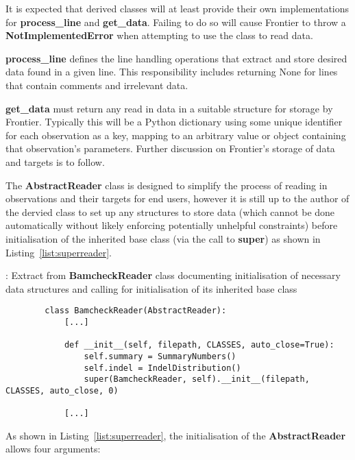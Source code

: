 It is expected that derived classes will at least provide their own
implementations for \textbf{process\_line} and \textbf{get\_data}. Failing to do
so will cause Frontier to throw a \textbf{NotImplementedError} when attempting
to use the class to read data.

\textbf{process\_line} defines the line handling operations that extract and store
desired data found in a given line. This responsibility includes returning None
for lines that contain comments and irrelevant data.

\textbf{get\_data} must return any read in data in a suitable structure for
storage by Frontier. Typically this will be a Python dictionary using some
unique identifier for each observation as a key, mapping to an arbitrary value
or object containing that observation's parameters. Further discussion on
Frontier's storage of data and targets is to follow.

The \textbf{AbstractReader} class is designed to simplify the process of reading
in observations and their targets for end users, however it is still up to the
author of the dervied class to set up any structures to store data (which cannot
be done automatically without likely enforcing potentially unhelpful
constraints) before initialisation of the inherited base class (via the call to
\textbf{super}) as shown in Listing~\ref{list:superreader}.

\begin{listing}[H]
    \caption[superreader]{: Extract from \textbf{BamcheckReader} class
        documenting initialisation of necessary data structures and calling
        for initialisation of its inherited base class}
    \label{list:superreader}
    \begin{verbatim}
        class BamcheckReader(AbstractReader):
            [...]

            def __init__(self, filepath, CLASSES, auto_close=True):
                self.summary = SummaryNumbers()
                self.indel = IndelDistribution()
                super(BamcheckReader, self).__init__(filepath, CLASSES, auto_close, 0)

            [...]
    \end{verbatim}
\end{listing}

As shown in Listing~\ref{list:superreader}, the initialisation of the
\textbf{AbstractReader} allows four arguments:

